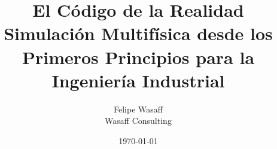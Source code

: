 \title{El Código de la Realidad \\ \large Simulación Multifísica desde los Primeros Principios para la Ingeniería Industrial}
\author{Felipe Wasaff \\ Wasaff Consulting}
\date{\today}

\usepackage{newfloat} %

\newcommand{\fenics}{\textsc{FEniCS}}